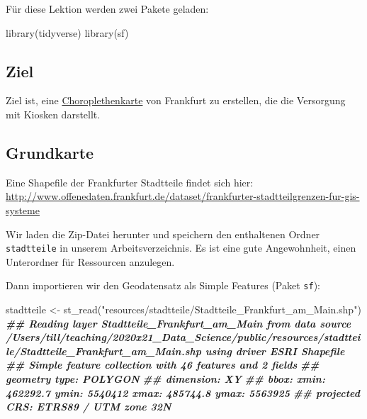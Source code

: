 \documentclass[11pt,german,a4paper]{article}
\newenvironment{Shaded}{\begin{snugshade}}{\end{snugshade}}
\newcommand{\DocumentationTok}[1]{\textcolor[rgb]{0.56,0.35,0.01}{\textbf{\textit{#1}}}}
\newcommand{\FunctionTok}[1]{\textcolor[rgb]{0.00,0.00,0.00}{#1}}
\newcommand{\NormalTok}[1]{#1}
\newcommand{\OtherTok}[1]{\textcolor[rgb]{0.56,0.35,0.01}{#1}}
\newcommand{\StringTok}[1]{\textcolor[rgb]{0.31,0.60,0.02}{#1}}
\begin{document}
Für diese Lektion werden zwei Pakete geladen:

\begin{Shaded}
\begin{Highlighting}[]
\FunctionTok{library}\NormalTok{(tidyverse)}
\FunctionTok{library}\NormalTok{(sf)}
\end{Highlighting}
\end{Shaded}

\hypertarget{ziel}{%
\subsection{Ziel}\label{ziel}}

Ziel ist, eine \href{https://de.wikipedia.org/wiki/Choroplethenkarte}{Choroplethenkarte} von Frankfurt zu erstellen, die die Versorgung mit Kiosken darstellt.

\hypertarget{grundkarte}{%
\subsection{Grundkarte}\label{grundkarte}}

Eine Shapefile der Frankfurter Stadtteile findet sich hier: \url{http://www.offenedaten.frankfurt.de/dataset/frankfurter-stadtteilgrenzen-fur-gis-systeme}

Wir laden die Zip-Datei herunter und speichern den enthaltenen Ordner \texttt{stadtteile} in unserem Arbeitsverzeichnis. Es ist eine gute Angewohnheit, einen Unterordner für Ressourcen anzulegen.

Dann importieren wir den Geodatensatz als Simple Features (Paket \texttt{sf}):

\begin{Shaded}
\begin{Highlighting}[]
\NormalTok{stadtteile }\OtherTok{\textless{}{-}} \FunctionTok{st\_read}\NormalTok{(}\StringTok{"resources/stadtteile/Stadtteile\_Frankfurt\_am\_Main.shp"}\NormalTok{)}
\DocumentationTok{\#\# Reading layer \textasciigrave{}Stadtteile\_Frankfurt\_am\_Main\textquotesingle{} from data source \textasciigrave{}/Users/till/teaching/2020x21\_Data\_Science/public/resources/stadtteile/Stadtteile\_Frankfurt\_am\_Main.shp\textquotesingle{} using driver \textasciigrave{}ESRI Shapefile\textquotesingle{}}
\DocumentationTok{\#\# Simple feature collection with 46 features and 2 fields}
\DocumentationTok{\#\# geometry type:  POLYGON}
\DocumentationTok{\#\# dimension:      XY}
\DocumentationTok{\#\# bbox:           xmin: 462292.7 ymin: 5540412 xmax: 485744.8 ymax: 5563925}
\DocumentationTok{\#\# projected CRS:  ETRS89 / UTM zone 32N}
\end{Highlighting}
\end{Shaded}
\end{document}

